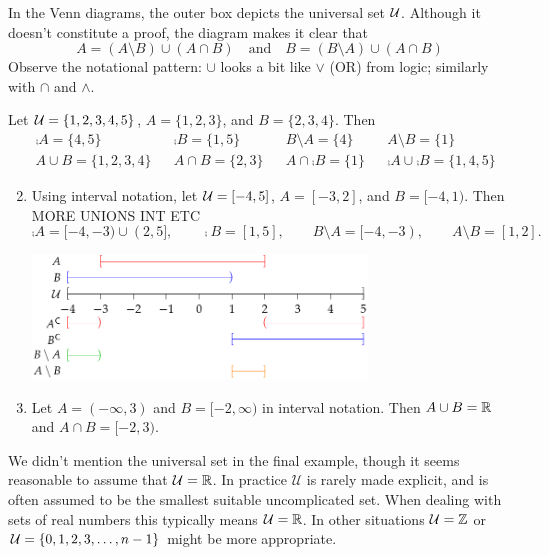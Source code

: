 
In the Venn diagrams, the outer box depicts the universal set $\mathcal{U}$. Although it doesn't constitute a proof, the diagram makes it clear that
\[
	A=(A\setminus B)\cup (A\cap B)\quad\text{and}\quad B=(B\setminus A)\cup(A\cap B)
\]
Observe the notational pattern: $\cup$ looks a bit like $\vee$ (OR) from logic; similarly with $\cap$ and $\wedge$.



\begin{examples}{}{}
	\exstart Let $\mathcal{U}=\{1,2,3,4,5\}$, $A=\{1,2,3\}$, and $B=\{2,3,4\}$. Then
	\begin{align*}
		&\comp A=\{4,5\} &&\comp B=\{1,5\} &&B\setminus A=\{4\} &&A\setminus B=\{1\}\\
		&A\cup B=\{1,2,3,4\} &&A\cap B=\{2,3\} &&A\cap\comp B=\{1\} &&\comp A\cup\comp B=\{1,4,5\}
	\end{align*}
	
	\goodbreak
		
\begin{enumerate}\setcounter{enumi}{1}
\item Using interval notation, let $\mathcal{U}=[-4,5]$, $A=[-3,2]$, and $B=[-4,1)$. Then MORE UNIONS INT ETC
\[\comp A=[-4,-3)\cup (2,5],\qquad \comp B=[1,5],\qquad B\setminus A=[-4,-3),\qquad A\setminus B=[1,2].\]
\vspace{-24pt}
\begin{center}
\includegraphics[width=0.7\textwidth]{sets-13-intervalex}
\end{center}\vspace{-13pt}
\item Let $A=(-\infty,3)$ and $B=[-2,\infty)$ in interval notation. Then $A\cup B=\mathbb{R}$ and $A\cap B=[-2,3)$.
\end{enumerate}
\end{examples}

We didn't mention the universal set in the final example, though it seems reasonable to assume that $\mathcal{U}=\mathbb{R}$. In practice $\mathcal U$ is rarely made explicit, and is often assumed to be the smallest suitable uncomplicated set. When dealing with sets of real numbers this typically means $\mathcal{U}=\mathbb{R}$. In other situations $\mathcal{U}=\mathbb{Z}$ or $\mathcal{U}=\{0,1,2,3,\ldots,n-1\}$ might be more appropriate.\par


